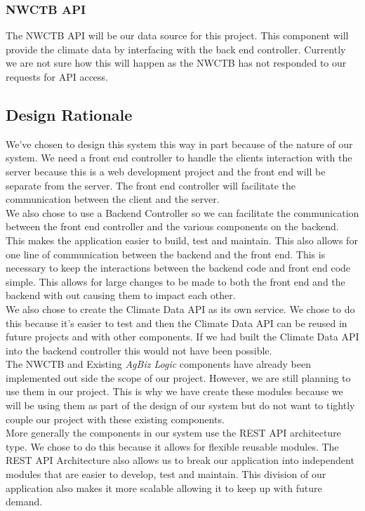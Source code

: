 \documentclass[onecolumn, draftclsnofoot,10pt, compsoc]{article}
\begin{document}
		\subsubsection{NWCTB API}
			The NWCTB API will be our data source for this project. This component will provide the climate data by interfacing with the back end controller. Currently we are not sure how this will happen as the NWCTB has not responded to our requests for API access.\\

	\subsection{Design Rationale}
		We've chosen to design this system this way in part because of the nature of our system. We need a front end controller to handle the clients interaction with the server because this is a web development project and the front end will be separate from the server. The front end controller will facilitate the communication between the client and the server.\\
		We also chose to use a Backend Controller so we can facilitate the communication between the front end controller and the various components on the backend. This makes the application easier to build, test and maintain. This also allows for one line of communication between the backend and the front end. This is necessary to keep the interactions between the backend code and front end code simple. This allows for large changes to be made to both the front end and the backend with out causing them to impact each other.\\
		We also chose to create the Climate Data API as its own service. We chose to do this because it's easier to test and then the Climate Data API can be reused in future projects and with other components. If we had built the Climate Data API into the backend controller this would not have been possible.\\
		The NWCTB and Existing \textit{AgBiz Logic} components have already been implemented out side the scope of our project. However, we are still planning to use them in our project. This is why we have create these modules because we will be using them as part of the design of our system but do not want to tightly couple our project with these existing components.\\
		More generally the components in our system use the REST API architecture type. We chose to do this because it allows for flexible reusable modules. The REST API Architecture also allows us to break our application into independent modules that are easier to develop, test and maintain. This division of our application also makes it more scalable allowing it to keep up with future demand.\\
\end{document}
